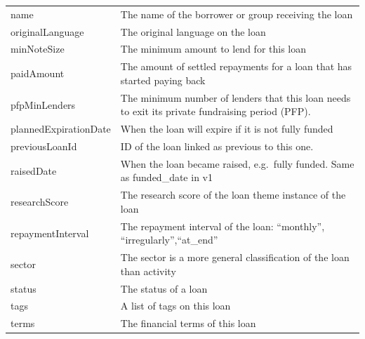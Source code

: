 \begin{longtable}{|p{}|p{}|}
	name                                 & The name of the borrower or group receiving the loan              \\
	originalLanguage                     & The original language on the loan                                 \\
	minNoteSize                          & The minimum amount to lend for this loan                          \\
	paidAmount                           & The amount of settled repayments for a loan that has
	started paying back                                                                                      \\
	pfpMinLenders                        & The minimum number of lenders that this loan needs to
	exit its private fundraising period (PFP).                                                               \\
	plannedExpirationDate                & When the loan will expire if it is not fully
	funded                                                                                                   \\
	previousLoanId                       & ID of the loan linked as previous to this one.                    \\
	raisedDate                           & When the loan became raised, e.g.~fully funded. Same as
	funded\_date in v1                                                                                       \\
	researchScore                        & The research score of the loan theme instance of the
	loan                                                                                                     \\
	repaymentInterval                    & The repayment interval of the loan: ``monthly'',
	``irregularly'',``at\_end''                                                                              \\
	sector                               & The sector is a more general classification of the loan than
	activity                                                                                                 \\
	status                               & The status of a loan                                              \\
	tags                                 & A list of tags on this loan                                       \\
	terms                                & The financial terms of this loan                                  \\

\end{longtable}
